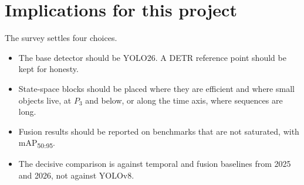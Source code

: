 \section{Implications for this project}

The survey settles four choices.
\begin{itemize}
  \item The base detector should be YOLO26. A DETR reference point should be
        kept for honesty.
  \item State-space blocks should be placed where they are efficient and
        where small objects live, at $P_3$ and below, or along the time axis,
        where sequences are long.
  \item Fusion results should be reported on benchmarks that are not
        saturated, with mAP\textsubscript{50:95}.
  \item The decisive comparison is against temporal and fusion baselines
        from 2025 and 2026, not against YOLOv8.
\end{itemize}
